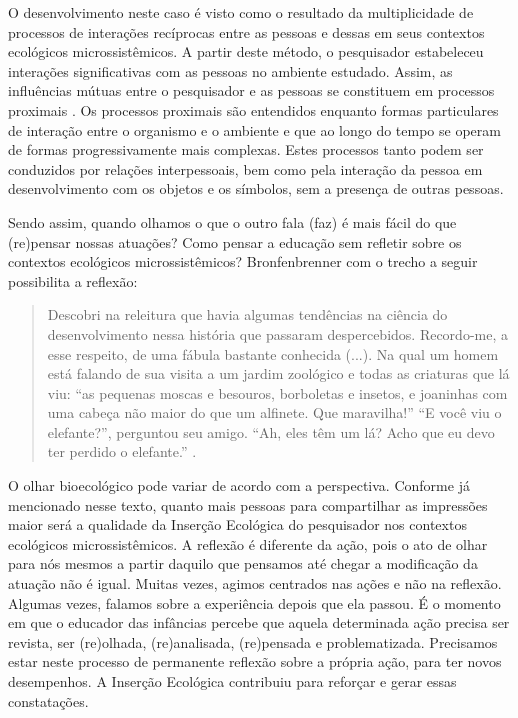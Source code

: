 \documentclass{textolivre-html}
\begin{document}
O desenvolvimento neste caso é visto como o resultado da multiplicidade de processos de interações recíprocas entre as pessoas e dessas em seus contextos ecológicos microssistêmicos. A partir deste método, o pesquisador estabeleceu interações significativas com as pessoas no ambiente estudado. Assim, as influências mútuas entre o pesquisador e as pessoas se constituem em processos proximais \cite{brofen2011}. Os processos proximais são entendidos enquanto formas particulares de interação entre o organismo e o ambiente e que ao longo do tempo se operam de formas progressivamente mais complexas. Estes processos tanto podem ser conduzidos por relações interpessoais, bem como pela interação da pessoa em desenvolvimento com os objetos e os símbolos, sem a presença de outras pessoas. 

Sendo assim, quando olhamos o que o outro fala (faz) é mais fácil do que (re)pensar nossas atuações? Como pensar a educação sem refletir sobre os contextos ecológicos microssistêmicos? Bronfenbrenner com o trecho a seguir possibilita a reflexão: 


\begin{quote}
Descobri na releitura que havia algumas tendências na ciência do desenvolvimento nessa história que passaram despercebidos. Recordo-me, a esse respeito, de uma fábula bastante conhecida (...). Na qual um homem está falando de sua visita a um jardim zoológico e todas as criaturas que lá viu: “as pequenas moscas e besouros, borboletas e insetos, e joaninhas com uma cabeça não maior do que um alfinete. Que maravilha!” “E você viu o elefante?”, perguntou seu amigo. “Ah, eles têm um lá? Acho que eu devo ter perdido o elefante.” \cite[p. 95-96]{brofen2011}.   
\end{quote}

O olhar bioecológico pode variar de acordo com a perspectiva. Conforme já mencionado nesse texto, quanto mais pessoas para compartilhar as impressões maior será a qualidade da Inserção Ecológica do pesquisador nos contextos ecológicos microssistêmicos. A reflexão é diferente da ação, pois o ato de olhar para nós mesmos a partir daquilo que pensamos até chegar a modificação da atuação não é igual. Muitas vezes, agimos centrados nas ações e não na reflexão. Algumas vezes, falamos sobre a experiência depois que ela passou. É o momento em que o educador das infâncias percebe que aquela determinada ação precisa ser revista, ser (re)olhada, (re)analisada, (re)pensada e problematizada. Precisamos estar neste processo de permanente reflexão sobre a própria ação, para ter novos desempenhos. A Inserção Ecológica contribuiu para reforçar e gerar essas constatações.  
\end{document}
